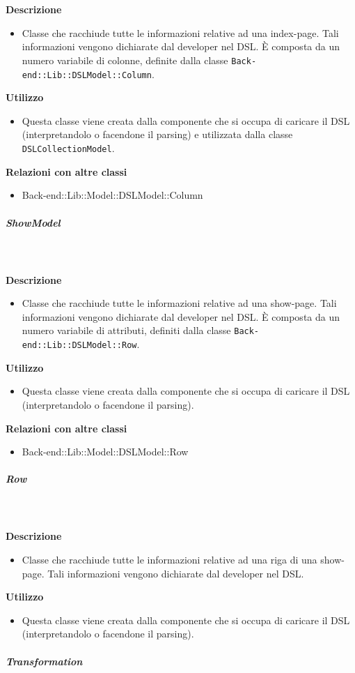 				\textbf{\\ \\ Descrizione} 
					\begin{itemize}
						\item[] Classe che racchiude tutte le informazioni relative ad una index-page. Tali informazioni vengono dichiarate dal developer nel DSL. È composta da un numero variabile di colonne, definite dalla classe \texttt{Back-end::Lib::DSLModel::Column}.
					\end{itemize}      
				\textbf{Utilizzo}  
					\begin{itemize}
						\item[] Questa classe viene creata dalla componente che si occupa di caricare il DSL (interpretandolo o facendone il parsing) e utilizzata dalla classe \texttt{DSLCollectionModel}.
					\end{itemize}
					\textbf{Relazioni con altre classi}
					\begin{itemize}
							\item{Back-end::Lib::Model::DSLModel::Column}
					\end{itemize}
			\subparagraph{ShowModel}
				
				\textbf{\\ \\ Descrizione} 
					\begin{itemize}
						\item[] Classe che racchiude tutte le informazioni relative ad una show-page. Tali informazioni vengono dichiarate dal developer nel DSL. È composta da un numero variabile di attributi, definiti dalla classe \texttt{Back-end::Lib::DSLModel::Row}.
					\end{itemize}      
				\textbf{Utilizzo}  
					\begin{itemize}
						\item[] Questa classe viene creata dalla componente che si occupa di caricare il DSL (interpretandolo o facendone il parsing).
					\end{itemize}
					\textbf{Relazioni con altre classi}
					\begin{itemize}
							\item{Back-end::Lib::Model::DSLModel::Row}
					\end{itemize}
			\subparagraph{Row}
				
				\textbf{\\ \\ Descrizione} 
					\begin{itemize}
						\item[] Classe che racchiude tutte le informazioni relative ad una riga di una show-page. Tali informazioni vengono dichiarate dal developer nel DSL.
					\end{itemize}      
				\textbf{Utilizzo}  
					\begin{itemize}
						\item[] Questa classe viene creata dalla componente che si occupa di caricare il DSL (interpretandolo o facendone il parsing).
					\end{itemize}
			\subparagraph{Transformation}
				
